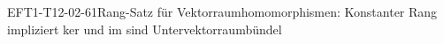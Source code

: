 
\begin{PROP}{EFT1-T12-02-61}{Rang-Satz für Vektorraumhomomorphismen: Konstanter Rang impliziert ker und im sind Untervektorraumbündel}
\end{PROP}
